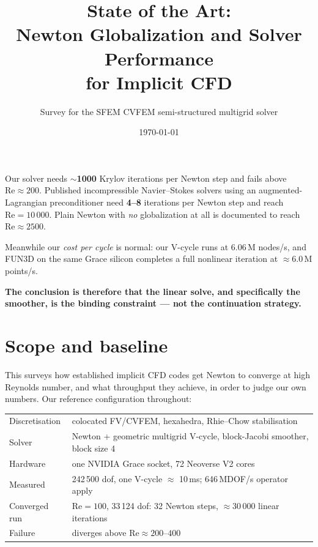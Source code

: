 \documentclass[11pt,a4paper]{article}
\title{\bfseries State of the Art:\\ Newton Globalization and Solver Performance\\ for Implicit CFD}
\author{Survey for the SFEM CVFEM semi-structured multigrid solver}
\date{\today}
\newcommand{\Rey}{\mathrm{Re}}
\begin{document}
\maketitle

\begin{tcolorbox}[colback=red!4,colframe=red!55!black,title=\bfseries Headline finding]
Our solver needs $\sim$\textbf{1000} Krylov iterations per Newton step and fails above
$\Rey \approx 200$. Published incompressible Navier--Stokes solvers using an
augmented-Lagrangian preconditioner need \textbf{4--8} iterations per Newton step and reach
$\Rey = 10\,000$. Plain Newton with \emph{no} globalization at all is documented to reach
$\Rey \approx 2500$.

Meanwhile our \emph{cost per cycle} is normal: our V-cycle runs at 6.06\,M nodes/s, and FUN3D
on the same Grace silicon completes a full nonlinear iteration at $\approx 6.0$\,M points/s.

\medskip
\textbf{The conclusion is therefore that the linear solve, and specifically the smoother, is
the binding constraint --- not the continuation strategy.}
\end{tcolorbox}

\section{Scope and baseline}

This surveys how established implicit CFD codes get Newton to converge at high Reynolds
number, and what throughput they achieve, in order to judge our own numbers. Our reference
configuration throughout:

\begin{center}
\begin{tabular}{@{}ll@{}}
\toprule
Discretisation & colocated FV/CVFEM, hexahedra, Rhie--Chow stabilisation \\
Solver & Newton + geometric multigrid V-cycle, block-Jacobi smoother, block size 4 \\
Hardware & one NVIDIA Grace socket, 72 Neoverse V2 cores \\
Measured & 242\,500 dof, one V-cycle $\approx$ 10\,ms; 646\,MDOF/s operator apply \\
Converged run & $\Rey=100$, 33\,124 dof: 32 Newton steps, $\approx$30\,000 linear iterations \\
Failure & diverges above $\Rey \approx 200$--$400$ \\
\bottomrule
\end{tabular}
\end{center}
\end{document}

